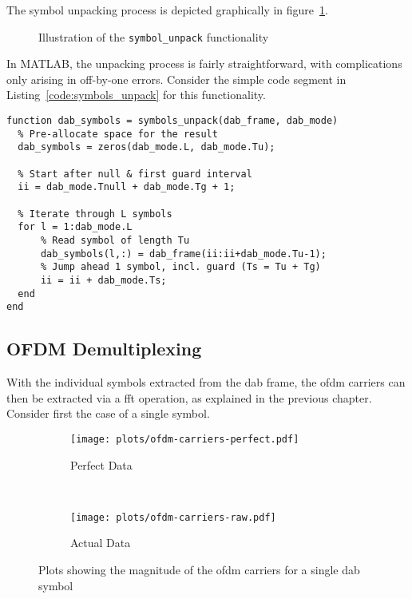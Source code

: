 \documentclass[class=report,11pt,crop=false]{standalone}
\begin{document}
The symbol unpacking process is depicted graphically in figure~\ref{fig:symbols_unpack}.

\begin{figure}[htbp]
  \centering
  \captionsetup{type=figure}
  \def\svgwidth{\linewidth}
  { %
      }
  \caption{Illustration of the \texttt{symbol\_unpack} functionality}
  \label{fig:symbols_unpack}
\end{figure}

In MATLAB, the unpacking process is fairly straightforward, with complications only arising in off-by-one errors. Consider the simple code segment in Listing~\ref{code:symbols_unpack} for this functionality.

\begin{lstlisting}[caption={Code used in the \texttt{symbols\_unpack} function}, label={code:symbols_unpack}]
function dab_symbols = symbols_unpack(dab_frame, dab_mode)
  % Pre-allocate space for the result
  dab_symbols = zeros(dab_mode.L, dab_mode.Tu);

  % Start after null & first guard interval
  ii = dab_mode.Tnull + dab_mode.Tg + 1;

  % Iterate through L symbols
  for l = 1:dab_mode.L
      % Read symbol of length Tu
      dab_symbols(l,:) = dab_frame(ii:ii+dab_mode.Tu-1);
      % Jump ahead 1 symbol, incl. guard (Ts = Tu + Tg)
      ii = ii + dab_mode.Ts;
  end
end
\end{lstlisting}

\subsection{OFDM Demultiplexing \label{subsect:dab-proc_ofdm-demux}}
With the individual symbols extracted from the \gls{dab} frame, the \gls{ofdm} carriers can then be extracted via a \gls{fft} operation, as explained in the previous chapter. Consider first the case of a single symbol.

\begin{figure}[htbp]
  \centering
  \begin{subfigure}[t]{0.45\textwidth}
    \centering
    \captionsetup{type=figure}
    \texttt{[image: plots/ofdm-carriers-perfect.pdf]}
    \caption{Perfect Data}
    \label{fig:ofdm-carriers-perfect}
  \end{subfigure}%
  ~ 
  \begin{subfigure}[t]{0.45\textwidth}
    \centering
    \captionsetup{type=figure}
    \texttt{[image: plots/ofdm-carriers-raw.pdf]}
    \caption{Actual Data}
    \label{fig:ofdm-carriers-raw}
  \end{subfigure}
  \caption{Plots showing the magnitude of the \gls{ofdm} carriers for a single \gls{dab} symbol}
  \label{fig:dqpsk_demap_perfect}
\end{figure}
\end{document}
